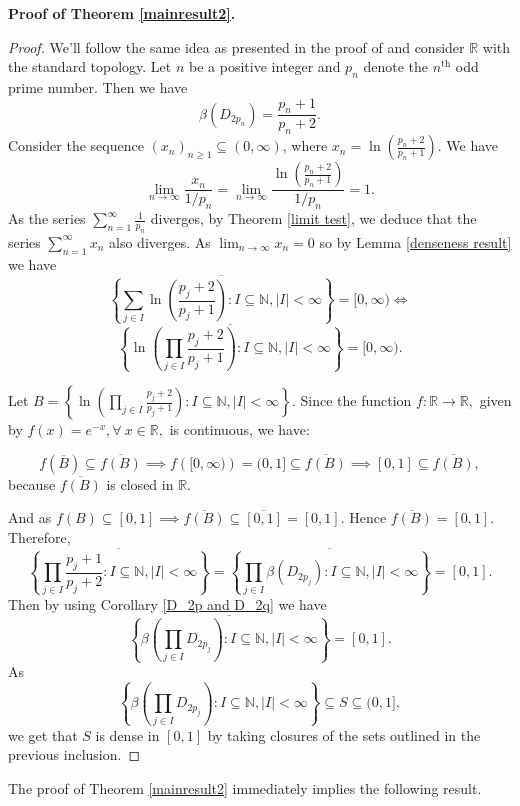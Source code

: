 \documentclass[a4paper,11pt]{amsart}
\numberwithin{equation}{section}
\numberwithin{equation}{subsection}
\begin{document}
\textbf{Proof of Theorem \ref{mainresult2}.}
\begin{proof}
We'll follow the same idea as presented in the proof of \cite[Theorem 3.2]{RS} and consider $\mathbb{R}$ with the standard topology. Let $n$ be a positive integer and $p_n$ denote the $n^{\text{th}}$ odd prime number. Then we have
$$ \beta(D_{2p_n}) = \frac{p_n+1}{p_n+2}. $$
Consider the sequence $(x_n)_{n \ge 1} \subseteq (0, \infty)$, where $x_n = \ln\left(\frac{p_n+2}{p_n+1}\right)$. We have
$$ \lim_{n\to\infty} \frac{x_n}{1/p_n} = \lim_{n\to\infty} \frac{\ln\left(\frac{p_n+2}{p_n+1}\right)}{1/p_n} = 1. $$
As the series $\sum_{n=1}^\infty \frac{1}{p_n}$ diverges, by Theorem \ref{limit test}, we deduce that the series $\sum_{n=1}^\infty x_n$ also diverges. As $\lim_{n\to\infty} x_n = 0$ so by Lemma \ref{denseness result} we have
$$ \overline{\left\{ \sum_{j \in I} \ln\left(\frac{p_j+2}{p_j+1}\right) : I \subseteq \mathbb{N}, |I| < \infty \right\}} = [0, \infty) \iff $$
$$ \overline{\left\{ \ln\left(\prod_{j \in I} \frac{p_j+2}{p_j+1}\right) : I \subseteq \mathbb{N}, |I| < \infty \right\}} = [0, \infty). $$ 

Let $B= {\left\{ \ln\left(\prod_{j \in I} \frac{p_j+2}{p_j+1}\right) : I \subseteq \mathbb{N}, |I| < \infty \right\}}$. Since the function
$ f: \mathbb{R} \to \mathbb{R},$ given by $f(x) = e^{-x}, \forall \ x \in \mathbb{R},$
is continuous, we have:

$$ f(\overline{B}) \subseteq \overline{f(B)} \implies f\left([0,\infty)\right) = (0,1] \subseteq \overline{f(B)} \implies [0,1]\subseteq \overline{f(B)},$$ because $\overline{f(B)}$ is closed in $\mathbb{R}$.

And as $f(B)\subseteq [0,1]\implies \overline{f(B)}\subseteq\overline {[0,1]}=[0,1]$. Hence $\overline{f(B)}=[0,1].$ Therefore, $$\overline{\left\{ \prod_{j \in I} \frac{p_j+1}{p_j+2} : I \subseteq \mathbb{N}, |I| < \infty \right\}}=  \overline{\left\{ \prod_{j \in I} \beta(D_{2p_j}) : I \subseteq \mathbb{N}, |I| < \infty \right\}}= [0,1].$$ Then by using Corollary \ref{D_2p and D_2q} we have $$ \overline{\left\{ \beta\left(\prod_{j\in I}D_{2p_j}\right) : I \subseteq \mathbb{N}, |I| < \infty \right\}}= [0,1].$$ 
As $$\left\{ \beta\left(\prod_{j\in I}D_{2p_j}\right) : I \subseteq \mathbb{N}, |I| < \infty \right\}\subseteq S \subseteq (0,1],$$ we get that $S$ is dense in $[0,1]$ by taking closures of the sets outlined in the previous inclusion.
\end{proof}

The proof of Theorem \ref{mainresult2} immediately implies the following result.
\end{document}
